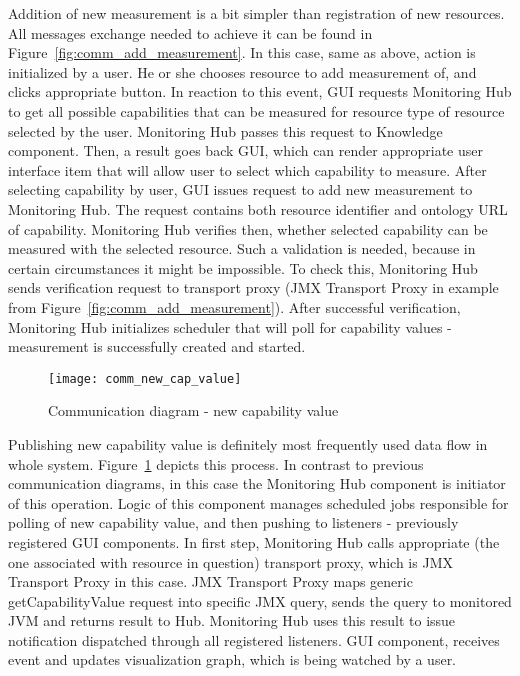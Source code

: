 Addition of new measurement is a bit simpler than registration of new resources. All messages exchange needed to achieve it can be found in Figure~\ref{fig:comm_add_measurement}. In this case, same as above, action is initialized by a user. He or she chooses resource to add measurement of, and clicks appropriate button. In reaction to this event, GUI requests Monitoring Hub to get all possible capabilities that can be measured for resource type of resource selected by the user. Monitoring Hub passes this request to Knowledge component. Then, a result goes back GUI, which can render appropriate user interface item that will allow user to select which capability to measure. After selecting capability by user, GUI issues request to add new measurement to Monitoring Hub. The request contains both resource identifier and ontology URL of capability. Monitoring Hub verifies then, whether selected capability can be measured with the selected resource. Such a validation is needed, because in certain circumstances it might be impossible. To check this, Monitoring Hub sends verification request to transport proxy (JMX Transport Proxy in example from Figure~\ref{fig:comm_add_measurement}). After successful verification, Monitoring Hub initializes scheduler that will poll for capability values - measurement is successfully created and started.

\begin{figure}[ht]
\centering
\texttt{[image: comm\_new\_cap\_value]}
\caption{Communication diagram - new capability value}
\label{fig:comm_new_cap_value}
\end{figure}

Publishing new capability value is definitely most frequently used data flow in whole system. Figure~\ref{fig:comm_new_cap_value} depicts this process. In contrast to previous communication diagrams, in this case the Monitoring Hub component is initiator of this operation. Logic of this component manages scheduled jobs responsible for polling of new capability value, and then pushing to listeners - previously registered GUI components. In first step, Monitoring Hub calls appropriate (the one associated with resource in question) transport proxy, which is JMX Transport Proxy in this case. JMX Transport Proxy maps generic getCapabilityValue request into specific JMX query, sends the query to monitored JVM and returns result to Hub. Monitoring Hub uses this result to issue notification dispatched through all registered listeners. GUI component, receives event and updates visualization graph, which is being watched by a user.

